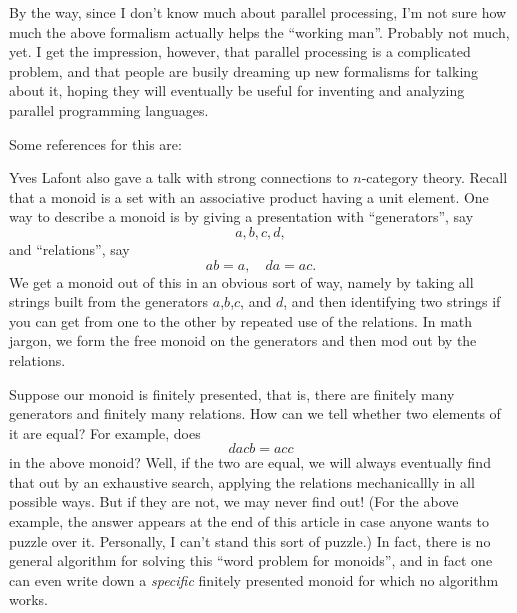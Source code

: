 \documentclass{article}
\renewcommand{\texttt}[1]{%
  \begingroup
  \ttfamily
  \begingroup\lccode`~=`/\lowercase{\endgroup\def~}{/\discretionary{}{}{}}%
  \begingroup\lccode`~=`[\lowercase{\endgroup\def~}{[\discretionary{}{}{}}%
  \begingroup\lccode`~=`.\lowercase{\endgroup\def~}{.\discretionary{}{}{}}%
  \catcode`/=\active\catcode`[=\active\catcode`.=\active
  \scantokens{#1\noexpand}%
  \endgroup
}
\begin{document}
By the way, since I don't know much about parallel processing, I'm not
sure how much the above formalism actually helps the ``working man''.
Probably not much, yet. I get the impression, however, that parallel
processing is a complicated problem, and that people are busily dreaming
up new formalisms for talking about it, hoping they will eventually be
useful for inventing and analyzing parallel programming languages.

Some references for this are:


Yves Lafont also gave a talk with strong connections to \(n\)-category
theory. Recall that a monoid is a set with an associative product having
a unit element. One way to describe a monoid is by giving a presentation
with ``generators'', say \[a, b, c, d,\] and ``relations'', say
\[ab = a,\quad da = ac.\] We get a monoid out of this in an obvious sort
of way, namely by taking all strings built from the generators
\(a\),\(b\),\(c\), and \(d\), and then identifying two strings if you
can get from one to the other by repeated use of the relations. In math
jargon, we form the free monoid on the generators and then mod out by
the relations.

Suppose our monoid is finitely presented, that is, there are finitely
many generators and finitely many relations. How can we tell whether two
elements of it are equal? For example, does \[dacb = acc\] in the above
monoid? Well, if the two are equal, we will always eventually find that
out by an exhaustive search, applying the relations mechanicallly in all
possible ways. But if they are not, we may never find out! (For the
above example, the answer appears at the end of this article in case
anyone wants to puzzle over it. Personally, I can't stand this sort of
puzzle.) In fact, there is no general algorithm for solving this ``word
problem for monoids'', and in fact one can even write down a
\emph{specific} finitely presented monoid for which no algorithm works.
\end{document}

